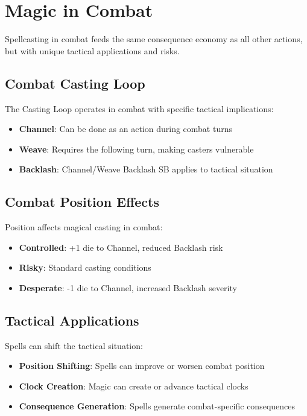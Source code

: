 \section*{Magic in Combat}

Spellcasting in combat feeds the same consequence economy as all other actions, but with unique tactical applications and risks.

\subsection*{Combat Casting Loop}

The Casting Loop operates in combat with specific tactical implications:

\begin{itemize}
    \item \textbf{Channel}: Can be done as an action during combat turns
    \item \textbf{Weave}: Requires the following turn, making casters vulnerable
    \item \textbf{Backlash}: Channel/Weave Backlash SB applies to tactical situation
\end{itemize}

\subsection*{Combat Position Effects}

Position affects magical casting in combat:

\begin{itemize}
    \item \textbf{Controlled}: +1 die to Channel, reduced Backlash risk
    \item \textbf{Risky}: Standard casting conditions
    \item \textbf{Desperate}: -1 die to Channel, increased Backlash severity
\end{itemize}

\subsection*{Tactical Applications}

Spells can shift the tactical situation:

\begin{itemize}
    \item \textbf{Position Shifting}: Spells can improve or worsen combat position
    \item \textbf{Clock Creation}: Magic can create or advance tactical clocks
    \item \textbf{Consequence Generation}: Spells generate combat-specific consequences
\end{itemize}

